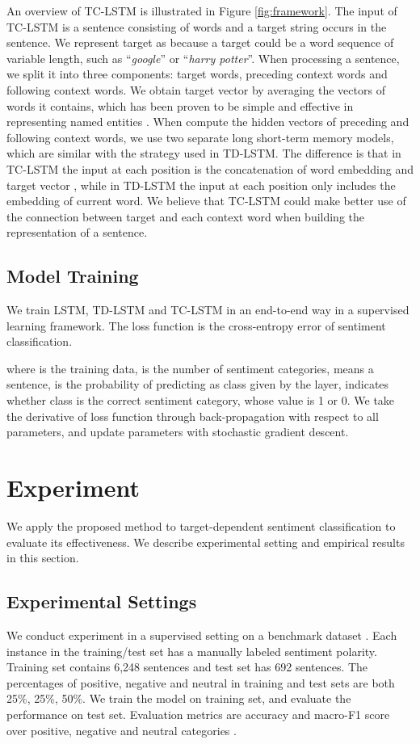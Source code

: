 \documentclass[11pt]{article}
\begin{document}
An overview of TC-LSTM is illustrated in Figure \ref{fig:framework}. 
The input of TC-LSTM is a sentence consisting of  words  and a target string  occurs in the sentence. We represent target  as  because a target could be a word sequence of variable length, such as ``\textit{google}'' or ``\textit{harry potter}''. 
When processing a sentence, we split it into three components: target words, preceding context words and following context words.
We obtain target vector  by averaging the vectors of words it contains, which has been proven to be simple and effective in representing named entities \cite{Socher2013b,Sun2015}. 
When compute the hidden vectors of preceding and following context words, we use two separate long short-term memory models, which are similar with the strategy used in TD-LSTM.
The difference is that in TC-LSTM the input at each position is the concatenation of word embedding and target vector , while in TD-LSTM the input at each position only includes the embedding of current word. 
We believe that TC-LSTM could make better use of the connection between target and each context word when building the representation of a sentence. 

\subsection{Model Training}
We train LSTM, TD-LSTM and TC-LSTM in an end-to-end way in a supervised learning framework. 
The loss function is the cross-entropy error of sentiment classification.


where  is the training data,  is the number of sentiment categories,  means a sentence,  is the probability of predicting  as class  given by the  layer,  indicates whether class  is the correct sentiment category, whose value is 1 or 0.
We take the derivative of loss function through back-propagation with respect to all parameters, and update parameters with stochastic gradient descent. 


\section{Experiment}
We apply the proposed method to target-dependent sentiment classification to evaluate its effectiveness.
We describe experimental setting and empirical results in this section.

\subsection{Experimental Settings}
We conduct experiment in a supervised setting on a benchmark dataset \cite{Dong2014a}. Each instance in the training/test set has a manually labeled sentiment polarity. 
Training set contains 6,248 sentences and test set has 692 sentences. 
The percentages of positive, negative and neutral in training and test sets are both 25\%, 25\%, 50\%.
We train the model on training set, and evaluate the performance on test set. 
Evaluation metrics are accuracy and macro-F1 score over positive, negative and neutral categories \cite{Manning1999,Jurafsky2000}.
\end{document}
